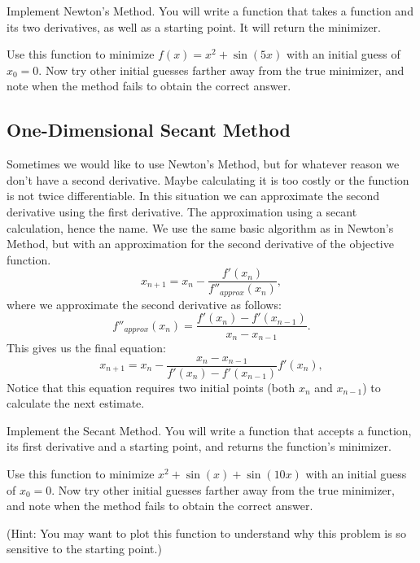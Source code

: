 \begin{problem}
Implement Newton's Method.
You will write a function that takes a function and its two derivatives, as well as a starting point.
It will return the minimizer.

Use this function to minimize $f(x) = x^2 + \sin(5x)$ with an initial guess of $x_0 = 0$.
Now try other initial guesses farther away from the true minimizer, and note when the method fails to obtain the correct answer.
\end{problem}

\subsection*{One-Dimensional Secant Method} %

Sometimes we would like to use Newton's Method, but for whatever reason we don't have a second derivative.
Maybe calculating it is too costly or the function is not twice differentiable.
In this situation we can approximate the second derivative using the first derivative.
The approximation using a secant calculation, hence the name.
We use the same basic algorithm as in Newton's Method, but with an approximation for the second derivative of the objective function.
\begin{equation*}
x_{n+1} = x_n - \frac{f'(x_n)}{f''_{approx}(x_n)},
\end{equation*}
where we approximate the second derivative as follows:
\begin{equation*}
f''_{approx}(x_n) = \frac{f'(x_n) - f'(x_{n-1})}{x_n - x_{n-1}}.
\end{equation*}
This gives us the final equation:
\begin{equation*}
x_{n+1} = x_n - \frac{x_n - x_{n-1}}{f'(x_n) - f'(x_{n-1})}f'(x_n),
\end{equation*}
Notice that this equation requires two initial points (both $x_n$ and $x_{n-1}$) to calculate the next estimate.

\begin{problem}
Implement the Secant Method.
You will write a function that accepts a function, its first derivative and a starting point, and returns the function's minimizer.

Use this function to minimize $x^2 + \sin(x) + \sin(10x)$ with an initial guess of $x_0 = 0$.
Now try other initial guesses farther away from the true minimizer, and note when the method fails to obtain the correct answer.

(Hint: You may want to plot this function to understand why this problem is so sensitive to the starting point.)
\end{problem}

